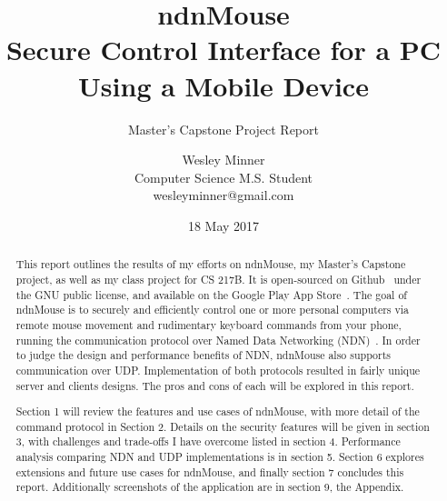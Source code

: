 \documentclass{sig-alternate}
\renewcommand\_{\textunderscore\allowbreak}  %
\begin{document}
	
\title{ndnMouse\\Secure Control Interface for a PC Using a Mobile Device}
\subtitle{Master's Capstone Project Report}
\author{
	Wesley Minner\\
	Computer Science M.S. Student\\
	wesleyminner@gmail.com
}

\date{18 May 2017}
\maketitle

\begin{abstract}
This report outlines the results of my efforts on ndnMouse, my Master's Capstone project, as well as my class project for CS 217B. It is open-sourced on Github~\cite{ndnMouseGH} under the GNU public license, and available on the Google Play App Store~\cite{ndnMouseGP}. The goal of ndnMouse is to securely and efficiently control one or more personal computers via remote mouse movement and rudimentary keyboard commands from your phone, running the communication protocol over Named Data Networking (NDN)~\cite{ndn}. In order to judge the design and performance benefits of NDN, ndnMouse also supports communication over UDP. Implementation of both protocols resulted in fairly unique server and clients designs. The pros and cons of each will be explored in this report.

Section 1 will review the features and use cases of ndnMouse, with more detail of the command protocol in Section 2. Details on the security features will be given in section 3, with challenges and trade-offs I have overcome listed in section 4. Performance analysis comparing NDN and UDP implementations is in section 5. Section 6 explores extensions and future use cases for ndnMouse, and finally section 7 concludes this report. Additionally screenshots of the application are in section 9, the Appendix.
\end{abstract}



\end{document}
